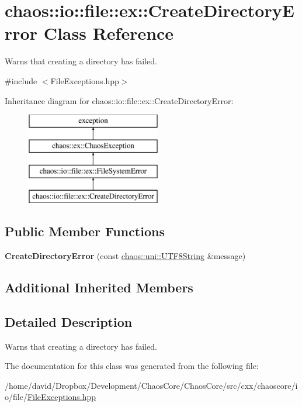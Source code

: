 \hypertarget{classchaos_1_1io_1_1file_1_1ex_1_1_create_directory_error}{\section{chaos\-:\-:io\-:\-:file\-:\-:ex\-:\-:Create\-Directory\-Error Class Reference}
\label{classchaos_1_1io_1_1file_1_1ex_1_1_create_directory_error}
}


Warns that creating a directory has failed.  




{\ttfamily \#include $<$File\-Exceptions.\-hpp$>$}

Inheritance diagram for chaos\-:\-:io\-:\-:file\-:\-:ex\-:\-:Create\-Directory\-Error\-:\begin{figure}[H]
\begin{center}
\leavevmode
\includegraphics[height=4.000000cm]{classchaos_1_1io_1_1file_1_1ex_1_1_create_directory_error}
\end{center}
\end{figure}
\subsection*{Public Member Functions}
\begin{DoxyCompactItemize}
\item 
\hypertarget{classchaos_1_1io_1_1file_1_1ex_1_1_create_directory_error_a6b468970fd3f8b6f786e0b41becdc019}{{\bfseries Create\-Directory\-Error} (const \hyperlink{classchaos_1_1uni_1_1_u_t_f8_string}{chaos\-::uni\-::\-U\-T\-F8\-String} \&message)}\label{classchaos_1_1io_1_1file_1_1ex_1_1_create_directory_error_a6b468970fd3f8b6f786e0b41becdc019}

\end{DoxyCompactItemize}
\subsection*{Additional Inherited Members}


\subsection{Detailed Description}
Warns that creating a directory has failed. 

The documentation for this class was generated from the following file\-:\begin{DoxyCompactItemize}
\item 
/home/david/\-Dropbox/\-Development/\-Chaos\-Core/\-Chaos\-Core/src/cxx/chaoscore/io/file/\hyperlink{_file_exceptions_8hpp}{File\-Exceptions.\-hpp}\end{DoxyCompactItemize}
